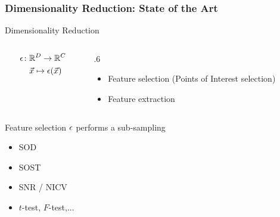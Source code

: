 \begin{frame}
\frametitle{Dimensionality Reduction: State of the Art}
\begin{block}{Dimensionality Reduction}
\begin{columns}

\begin{column}{.3\textwidth}
\begin{align*}
\epsilon \colon & \mathbb{R}^D\rightarrow \mathbb{R}^C\\
& \vec{x} \mapsto \epsilon(\vec{x})
\end{align*}

\end{column}
\begin{column} {.6\textwidth}
\begin{itemize}
\item Feature selection (Points of Interest selection)
\item Feature extraction
\end{itemize}
\end{column}

\end{columns}
\end{block}
\begin{columns}

\begin{column}{.4\textwidth}
\begin{block}{Feature selection}
$\epsilon$ performs a sub-sampling
\begin{itemize}
\item SOD \cite{Chari2003}
\item SOST \cite{bar2010improved}
\item SNR \cite{mangard2008power}/ NICV \cite{bhasin2014side}
\item $t$-test, $F$-test,... \cite{gierlichs2006templates,choudary2014efficient}
\end{itemize}
\end{block}
\end{column}

\begin{column}{.6\textwidth}
\end{column}
\end{columns}
\end{frame}
